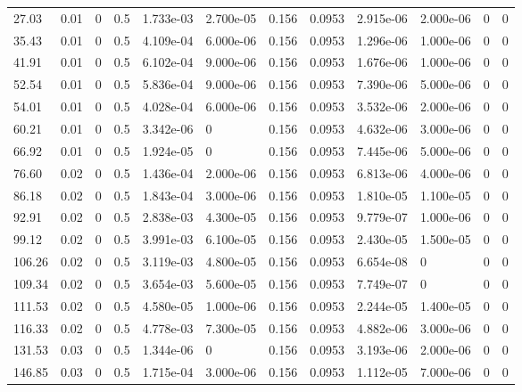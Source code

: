 \documentclass[preview]{standalone}
\begin{document}
{{\begin{tabular}{L{1.2cm}C{1.2cm} C{0.3cm}C{0.5cm} C{1.4cm}C{1.4cm} C{1.4cm}C{1.4cm} C{1.6cm}C{1.6cm} C{1.6cm}C{1.6cm}}
  27.03  &  0.01  & 0     & 0.5 &  1.733e-03  & 2.700e-05  &  0.156&   0.0953& 2.915e-06 & 2.000e-06   &  0 & 0  \\ 
  35.43  &  0.01  & 0     & 0.5 &  4.109e-04  & 6.000e-06  &  0.156&   0.0953& 1.296e-06 & 1.000e-06   &  0 & 0  \\ 
  41.91  &  0.01  & 0     & 0.5 &  6.102e-04  & 9.000e-06  &  0.156&   0.0953& 1.676e-06 & 1.000e-06   &  0 & 0  \\ 
  52.54  &  0.01  & 0     & 0.5 &  5.836e-04  & 9.000e-06  &  0.156&   0.0953& 7.390e-06 & 5.000e-06   &  0 & 0  \\ 
  54.01  &  0.01  & 0     & 0.5 &  4.028e-04  & 6.000e-06  &  0.156&   0.0953& 3.532e-06 & 2.000e-06   &  0 & 0  \\ 
  60.21  &  0.01  & 0     & 0.5 &  3.342e-06  & 0  &  0.156&   0.0953& 4.632e-06 & 3.000e-06   &  0 & 0  \\ 
  66.92  &  0.01  & 0     & 0.5 &  1.924e-05  & 0  &  0.156&   0.0953& 7.445e-06 & 5.000e-06   &  0 & 0  \\ 
  76.60  &  0.02  & 0     & 0.5 &  1.436e-04  & 2.000e-06  &  0.156&   0.0953& 6.813e-06 & 4.000e-06   &  0 & 0  \\ 
  86.18  &  0.02  & 0     & 0.5 &  1.843e-04  & 3.000e-06  &  0.156&   0.0953& 1.810e-05 & 1.100e-05   &  0 & 0  \\ 
  92.91  &  0.02  & 0     & 0.5 &  2.838e-03  & 4.300e-05  &  0.156&   0.0953& 9.779e-07 & 1.000e-06   &  0 & 0  \\ 
  99.12  &  0.02  & 0     & 0.5 &  3.991e-03  & 6.100e-05  &  0.156&   0.0953& 2.430e-05 & 1.500e-05   &  0 & 0  \\ 
  106.26  &  0.02  & 0     & 0.5 &  3.119e-03  & 4.800e-05  &  0.156&   0.0953& 6.654e-08 & 0   &  0 & 0  \\ 
  109.34  &  0.02  & 0     & 0.5 &  3.654e-03  & 5.600e-05  &  0.156&   0.0953& 7.749e-07 & 0   &  0 & 0  \\ 
  111.53  &  0.02  & 0     & 0.5 &  4.580e-05  & 1.000e-06  &  0.156&   0.0953& 2.244e-05 & 1.400e-05   &  0 & 0  \\ 
  116.33  &  0.02  & 0     & 0.5 &  4.778e-03  & 7.300e-05  &  0.156&   0.0953& 4.882e-06 & 3.000e-06   &  0 & 0  \\ 
  131.53  &  0.03  & 0     & 0.5 &  1.344e-06  & 0  &  0.156&   0.0953& 3.193e-06 & 2.000e-06   &  0 & 0  \\ 
  146.85  &  0.03  & 0     & 0.5 &  1.715e-04  & 3.000e-06  &  0.156&   0.0953& 1.112e-05 & 7.000e-06   &  0 & 0  \\ 

\end{tabular}}}
\end{document}
